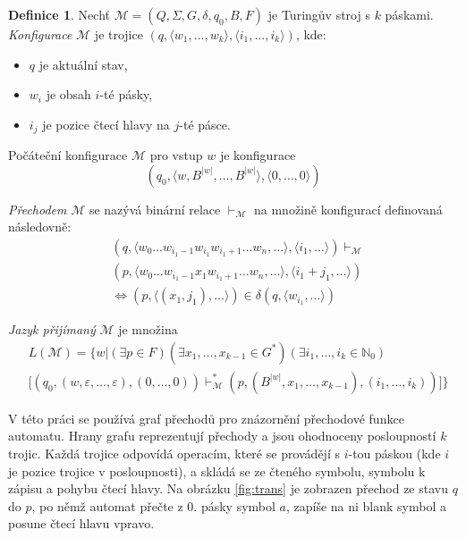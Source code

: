 \documentclass[thesis=B,czech]{FITthesis}[2019/12/23]
\theoremstyle{definition}
\newtheorem{definition}{Definice}[chapter]
\begin{document}
\begin{definition}
Nechť $\mathcal{M} = \left(Q, \Sigma, G, \delta, q_0, B, F\right)$ je Turingův stroj s $k$ páskami.
\emph{Konfigurace} $\mathcal{M}$ je trojice $\left(q, \langle w_1, \dots, w_k\rangle,  \langle i_1, \dots, i_k\rangle\right)$, kde:
\begin{itemize}
	\item{$q$ je aktuální stav,}
	\item{$w_i$ je obsah $i$-té pásky,}
	\item{$i_j$ je pozice čtecí hlavy na $j$-té pásce.}
\end{itemize}

Počáteční konfigurace $\mathcal{M}$ pro vstup $w$ je konfigurace $$\left(q_0, \langle w, B^{|w|}, \dots, B^{|w|} \rangle,  \langle 0, \dots, 0\rangle\right)$$

\emph{Přechodem} $\mathcal{M}$ se nazývá binární relace $\vdash_\mathcal{M}$ na množině konfigurací definovaná následovně:
\begin{equation}
\begin{split}
&\left(q, \langle w_0 \dots w_{i_1-1}w_{i_1}w_{i_1+1} \dots w_n, \dots \rangle,  \langle i_1, \dots \rangle\right) \vdash_\mathcal{M} \\
&\left(p, \langle w_0 \dots w_{i_1-1}x_1w_{i_1+1} \dots w_n,  \dots \rangle,  \langle i_1+j_1, \dots \rangle \right) \\
&\iff \left(p, \langle\left(x_1, j_1\right),  \dots \rangle\right) \in \delta\left(q, \langle w_{i_1}, \dots \rangle \right)
\end{split}
\end{equation}


\emph{Jazyk přijímaný} $\mathcal{M}$ je množina
\begin{equation}
	\begin{split}
&L\left(\mathcal{M}\right) =\bigg \{ w \mathrel{\bigg|} \left(\exists p \in F \right)  \left(\exists x_1,\dots, x_{k-1} \in G^\ast \right) \left(\exists i_1, \dots, i_{k} \in \mathbb{N}_0 \right) \\ 
&\Big [ \left(q_0, \left(w, \varepsilon, \dots, \varepsilon \right),  \left(0, \dots, 0\right)\right) \vdash_{\mathcal{M}}^{\ast} \left(p, \left(B^{|w|}, x_1,\dots, x_{k-1} \right),  \left(i_1, \dots, i_{k}\right)\right) \Big ] \bigg\}
\end{split}
\end{equation}
\end{definition}

V této práci se používá graf přechodů pro znázornění přechodové funkce automatu. Hrany grafu reprezentují přechody a jsou ohodnoceny posloupností $k$ trojic. Každá trojice odpovídá operacím, které se provádějí s $i$-tou páskou (kde $i$ je pozice trojice v posloupnosti), a skládá se ze čteného symbolu, symbolu k zápisu a pohybu čtecí hlavy. Na obrázku \ref{fig:trans} je zobrazen přechod ze stavu $q$ do $p$, po němž automat přečte z 0. pásky symbol $a$, zapíše na ni blank symbol a posune čtecí hlavu vpravo. 
\end{document}
